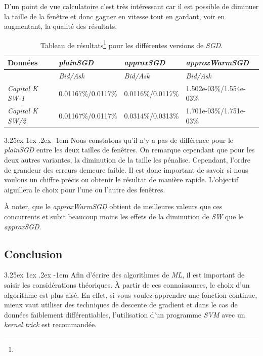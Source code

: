 \documentclass[a4paper, 11pt]{article}
\makeatletter
\renewcommand\paragraph{\@startsection{paragraph}{5}{\z@}%
  {3.25ex \@plus1ex \@minus.2ex}%
  {-1em}%
  {\normalfont\normalsize\bfseries}}
\makeatother
\begin{document}
D'un point de vue calculatoire c'est très intéressant car il est possible de diminuer la taille de la fenêtre et
donc gagner en vitesse tout en gardant, voir en augmentant, la qualité des résultats.


\begin{table}[H]
	\centering
\begin{tabular}{|l|l|l|l|}
	\hline
	Données & \textit{plainSGD} & \textit{approxSGD} & \textit{approxWarmSGD}\\
	\hline
	\ & \textit{Bid/Ask} & \textit{Bid/Ask} & \textit{Bid/Ask} \\
	\hline
	\textit{Capital K SW-1} & 0.01167\%/0.0117\% & 0.0116\%/0.0117\% & 1.502e-03\%/1.554e-03\% \\
	\hline
	\textit{Capital K SW/2} & 0.01167\%/0.0117\% & 0.0314\%/0.0313\% & 1.701e-03\%/1.751e-03\%\\
	\hline

\end{tabular}
\caption[]{Tableau de résultats\footnote{} pour les différentes versions de \textit{SGD}.}
\end{table}


\paragraph{}
Nous constatons qu'il n'y a pas de différence pour le \textit{plainSGD} entre les deux tailles de fenêtres. On
remarque cependant que pour les deux autres variantes, la diminution de la taille les pénalise. Cependant, l'ordre
de grandeur des erreurs demeure faible. Il est donc important de savoir si nous voulons un chiffre précis ou obtenir
le résultat de manière rapide. L'objectif aiguillera le choix pour l'une ou l'autre des fenêtres.

À noter, que le \textit{approxWarmSGD} obtient de meilleures valeurs que ces concurrents et subit beaucoup moins
les effets de la diminution de \textit{SW} que le \textit{approxSGD}.

\subsection{Conclusion}
\paragraph{}
Afin d'écrire des algorithmes de \textit{ML}, il est important de saisir les considérations théoriques.
À partir de ces connaissances, le choix d'un algorithme est plus aisé. En effet, si vous voulez apprendre une fonction
continue, mieux vaut utiliser des techniques de descente de gradient et dans le cas de données faiblement différentiables, 
l'utilisation d'un programme \textit{SVM} avec un \textit{kernel trick} est recommandée.
\end{document}
